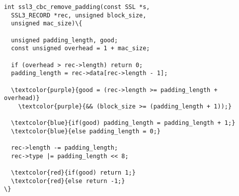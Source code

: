\begin{minipage}[t]{3.1in}
\small
\begin{Verbatim}
int ssl3_cbc_remove_padding(const SSL *s, 
  SSL3_RECORD *rec, unsigned block_size, 
  unsigned mac_size)\{

  unsigned padding_length, good;
  const unsigned overhead = 1 + mac_size;

  if (overhead > rec->length) return 0;
  padding_length = rec->data[rec->length - 1];

  \textcolor{purple}{good = (rec->length >= padding_length + overhead)}
    \textcolor{purple}{&& (block_size >= (padding_length + 1));}
    
  \textcolor{blue}{if(good) padding_length = padding_length + 1;}
  \textcolor{blue}{else padding_length = 0;}

  rec->length -= padding_length;
  rec->type |= padding_length << 8;

  \textcolor{red}{if(good) return 1;}
  \textcolor{red}{else return -1;}
\}
\end{Verbatim}
\end{minipage}